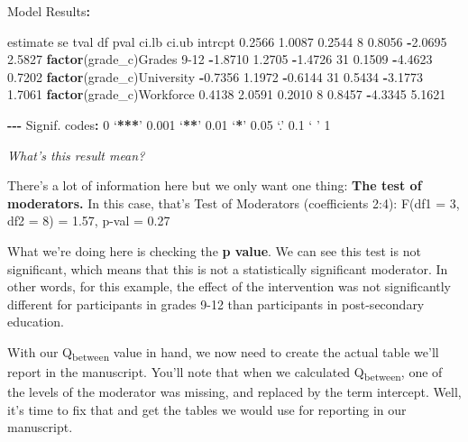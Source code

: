 \documentclass[
]{book}
\newenvironment{Shaded}{\begin{snugshade}}{\end{snugshade}}
\newcommand{\DecValTok}[1]{\textcolor[rgb]{0.00,0.00,0.81}{#1}}
\newcommand{\ErrorTok}[1]{\textcolor[rgb]{0.64,0.00,0.00}{\textbf{#1}}}
\newcommand{\FloatTok}[1]{\textcolor[rgb]{0.00,0.00,0.81}{#1}}
\newcommand{\FunctionTok}[1]{\textcolor[rgb]{0.13,0.29,0.53}{\textbf{#1}}}
\newcommand{\NormalTok}[1]{#1}
\newcommand{\SpecialCharTok}[1]{\textcolor[rgb]{0.81,0.36,0.00}{\textbf{#1}}}
\begin{document}
\begin{Shaded}
\begin{Highlighting}[]
\NormalTok{Model Results}\SpecialCharTok{:}

\NormalTok{                            estimate      se     tval  df    pval    ci.lb   ci.ub    }
\NormalTok{intrcpt                       }\FloatTok{0.2566}  \FloatTok{1.0087}   \FloatTok{0.2544}   \DecValTok{8}  \FloatTok{0.8056}  \SpecialCharTok{{-}}\FloatTok{2.0695}  \FloatTok{2.5827}    
\FunctionTok{factor}\NormalTok{(grade\_c)Grades }\DecValTok{9{-}12}   \SpecialCharTok{{-}}\FloatTok{1.8710}  \FloatTok{1.2705}  \SpecialCharTok{{-}}\FloatTok{1.4726}  \DecValTok{31}  \FloatTok{0.1509}  \SpecialCharTok{{-}}\FloatTok{4.4623}  \FloatTok{0.7202}    
\FunctionTok{factor}\NormalTok{(grade\_c)University    }\SpecialCharTok{{-}}\FloatTok{0.7356}  \FloatTok{1.1972}  \SpecialCharTok{{-}}\FloatTok{0.6144}  \DecValTok{31}  \FloatTok{0.5434}  \SpecialCharTok{{-}}\FloatTok{3.1773}  \FloatTok{1.7061}    
\FunctionTok{factor}\NormalTok{(grade\_c)Workforce      }\FloatTok{0.4138}  \FloatTok{2.0591}   \FloatTok{0.2010}   \DecValTok{8}  \FloatTok{0.8457}  \SpecialCharTok{{-}}\FloatTok{4.3345}  \FloatTok{5.1621}    

\SpecialCharTok{{-}{-}{-}}
\NormalTok{Signif. codes}\SpecialCharTok{:}  \DecValTok{0}\NormalTok{ ‘}\SpecialCharTok{**}\ErrorTok{*}\NormalTok{’ }\FloatTok{0.001}\NormalTok{ ‘}\SpecialCharTok{**}\NormalTok{’ }\FloatTok{0.01}\NormalTok{ ‘}\SpecialCharTok{*}\NormalTok{’ }\FloatTok{0.05}\NormalTok{ ‘.’ }\FloatTok{0.1}\NormalTok{ ‘ ’ }\DecValTok{1}
\end{Highlighting}
\end{Shaded}

\emph{What's this result mean?}

There's a lot of information here but we only want one thing: \textbf{The test of moderators.} In this case, that's Test of Moderators (coefficients 2:4): F(df1 = 3, df2 = 8) = 1.57, p-val = 0.27

What we're doing here is checking the \textbf{p value}. We can see this test is not significant, which means that this is not a statistically significant moderator. In other words, for this example, the effect of the intervention was not significantly different for participants in grades 9-12 than participants in post-secondary education.

With our Q\textsubscript{between} value in hand, we now need to create the actual table we'll report in the manuscript. You'll note that when we calculated Q\textsubscript{between}, one of the levels of the moderator was missing, and replaced by the term intercept. Well, it's time to fix that and get the tables we would use for reporting in our manuscript.
\end{document}
